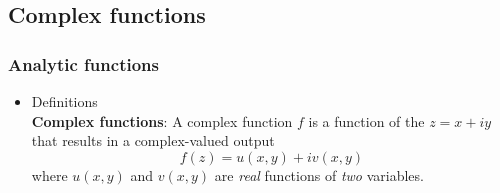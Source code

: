 \subsection{Complex functions}

\subsubsection{Analytic functions}
\begin{itemize}
	\item Definitions\\
	\textbf{Complex functions}: A complex function $f$ is a function of the  $z=x+iy$ that results in a complex-valued output
	$$
	f(z) = u(x,y) + iv(x,y)
	$$
	where $u(x,y)$ and $v(x,y) $ are \textit{real} functions of \textit{two} variables.
\end{itemize}